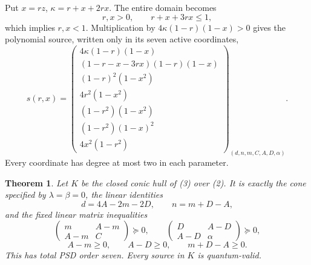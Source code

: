 \documentclass[11pt]{article}
\newtheorem{theorem}{Theorem}
\begin{document}
Put $x=rz$, $\kappa=r+x+2rx$. The entire domain becomes
\[
 r,x>0,\qquad r+x+3rx\leq1,                              \tag{2}
\]
which implies $r,x<1$. Multiplication by $4\kappa(1-r)(1-x)>0$
gives the polynomial source, written only in its seven active coordinates,
\[
 s(r,x)=\begin{pmatrix}
 4\kappa(1-r)(1-x)\\
 (1-r-x-3rx)(1-r)(1-x)\\
 (1-r)^2(1-x^2)\\
 4r^2(1-x^2)\\
 (1-r^2)(1-x^2)\\
 (1-r^2)(1-x)^2\\
 4x^2(1-r^2)
 \end{pmatrix}_{(d,n,m,C,A,D,\alpha)}.                   \tag{3}
\]
Every coordinate has degree at most two in each parameter.

\begin{theorem}
Let $K$ be the closed conic hull of (3) over (2). It is exactly the cone
specified by $\lambda=\beta=0$, the linear identities
\[
 d=4A-2m-2D,\qquad n=m+D-A,                              \tag{4}
\]
and the fixed linear matrix inequalities
\[
 \begin{pmatrix}m&A-m\\A-m&C\end{pmatrix}\succeq0,
 \qquad
 \begin{pmatrix}D&A-D\\A-D&\alpha\end{pmatrix}\succeq0,
                                                               \tag{5}
\]
\[
 A-m\geq0,\qquad A-D\geq0,\qquad m+D-A\geq0.            \tag{6}
\]
This has total PSD order seven. Every source in $K$ is quantum-valid.
\end{theorem}
\end{document}
